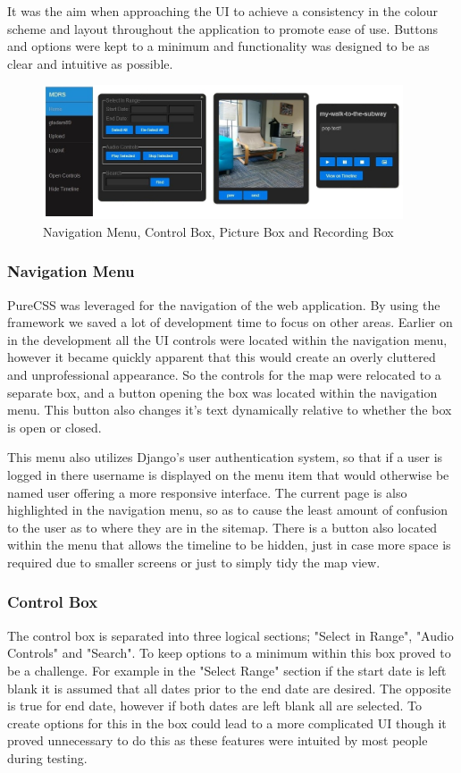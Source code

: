\documentclass{l3proj}
\begin{document}
It was the aim when approaching the UI to achieve a consistency in the colour scheme and layout throughout the application to promote ease of use. Buttons and options were kept to a minimum and functionality was designed to be as clear and intuitive as possible.

\begin{figure}[ht!]
\centering
\includegraphics[width=0.95\textwidth]{images/ui-elements.jpg}
\caption{Navigation Menu, Control Box, Picture Box and Recording Box}
\end{figure}

\subsubsection{Navigation Menu}		PureCSS was leveraged for the navigation of the web application. By using the framework we saved a lot of development time to focus on other areas. Earlier on in the development all the UI controls were located within the navigation menu, however it became quickly apparent that this would create an overly cluttered and unprofessional appearance. So the controls for the map were relocated to a separate box, and a button opening the box was located within the navigation menu. This button also changes it's text dynamically relative to whether the box is open or closed.

This menu also utilizes Django's user authentication system, so that if a user is logged in there username is displayed on the menu item that would otherwise be named user offering a more responsive interface. The current page is also highlighted in the navigation menu, so as to cause the least amount of confusion to the user as to where they are in the sitemap. There is a button also located within the menu that allows the timeline to be hidden, just in case more space is required due to smaller screens or just to simply tidy the map view.

\subsubsection{Control Box}		The control box is separated into three logical sections; "Select in Range", "Audio Controls" and "Search". To keep options to a minimum within this box proved to be a challenge. For example in the "Select Range" section if the start date is left blank it is assumed that all dates prior to the end date are desired. The opposite is true for end date, however if both dates are left blank all are selected. To create options for this in the box could lead to a more complicated UI though it proved unnecessary to do this as these features were intuited by most people during testing.
\end{document}
